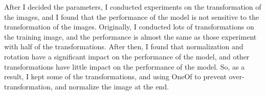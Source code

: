 After I decided the parameters, I conducted experiments on the transformation of the images, and I found that the performance of the model is not sensitive to the transformation of the images.
Originally, I conducted lots of transformations on the training image, and the performance is almost the same as those experiment with half of the transformations.
After then, I found that normalization and rotation have a significant impact on the performance of the model, and other transformations have little impact on the performance of the model.
So, as a result, I kept some of the transformations, and using OneOf to prevent over-transformation, and normalize the image at the end.